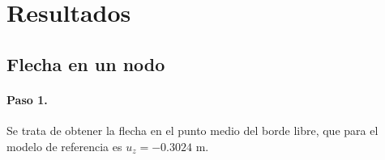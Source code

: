 \documentclass[spanish,a4paper,12pt]{article}
\begin{document}
\section{Resultados}
\label{sec:resultados}
\subsection{Flecha en un nodo}

\paragraph{Paso 1.} Se trata de obtener la flecha en el punto medio del borde libre, que para el modelo de referencia es $u_{z}=-0.3024$ m.
\begin{figure}[h!tp]
\centering
	\quad

\end{figure}
\end{document}
